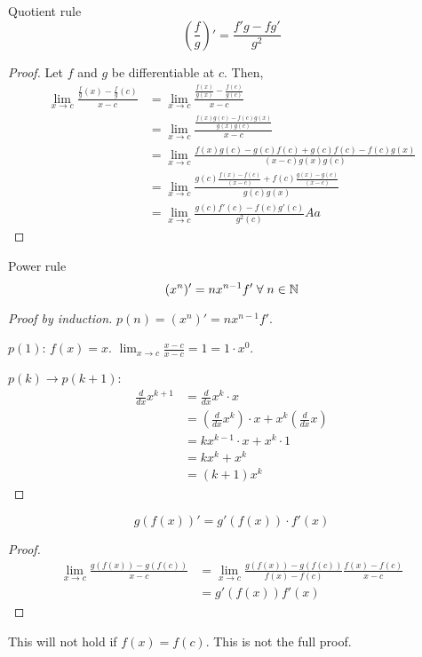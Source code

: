 \begin{theorem}{Quotient rule}{}
    $$(\frac{f}{g})' = \frac{f'g - fg'}{g^2}$$
\end{theorem}
\begin{proof}
    Let $f$ and $g$ be differentiable at $c$. Then,
    \begin{align*}
        \lim_{x \to c} \frac{\frac{f}{g}(x) - \frac{f}{g}(c)}{x - c} &= \lim_{x \to c} \frac{\frac{f(x)}{g(x)} - \frac{f(c)}{g(c)}}{x - c} \\
        &= \lim_{x \to c} \frac{\frac{f(x)g(c) - f(c)g(x)}{g(x)g(c)}}{x - c} \\
        &= \lim_{x \to c} \frac{f(x)g(c) - g(c)f(c) + g(c)f(c) - f(c)g(x)}{(x - c) g(x)g(c)} \\
        &= \lim_{x \to c} \frac{g(c) \frac{f(x) - f(c)}{(x - c)} + f(c) \frac{g(x) - g(c)}{(x - c)}}{g(c)g(x)} \\
        &= \lim_{x \to c} \frac{g(c)f'(c) - f(c)g'(c)}{g^2(c)}Aa
    \end{align*}
\end{proof}

\begin{theorem}{Power rule}{}
    $$(x^n)' = nx^{n - 1}f' \;\forall\; n \in \mathbb{N}$$
\end{theorem}
\begin{proof}[Proof by induction]
    $p(n) = (x^n)' = nx^{n - 1}f'$.

    $p(1)$: $f(x) = x$. $\lim_{x \to c} \frac{x - c}{x - c} = 1 = 1 \cdot x^0$.

    $p(k) \rightarrow p(k + 1)$:
    \begin{align*}
        \frac{d}{dx} x^{k + 1} &= \frac{d}{dx} x^k \cdot x \\
        &= (\frac{d}{dx} x^k) \cdot x + x^k (\frac{d}{dx} x) \\
        &= kx^{k - 1} \cdot x + x^k \cdot 1 \\
        &= kx^k + x^k \\
        &= (k + 1)x^k
    \end{align*}
\end{proof}

\begin{theorem}
    $$g(f(x))' = g'(f(x)) \cdot f'(x)$$
\end{theorem}
\begin{proof}
    \begin{align*}
        \lim_{x \to c} \frac{g(f(x)) - g(f(c))}{x - c} &= \lim_{x \to c} \frac{g(f(x)) - g(f(c))}{f(x) - f(c)} \frac{f(x) - f(c)}{x - c} \\
        &= g'(f(x)) f'(x)
    \end{align*}
\end{proof}
\begin{remark}
    This will not hold if $f(x) = f(c)$. This is not the full proof.
\end{remark}

